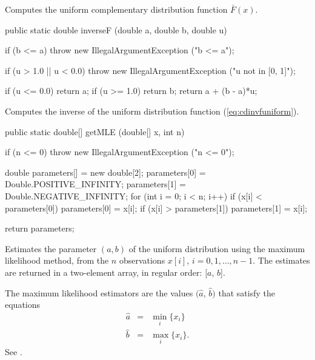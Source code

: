  \begin{tabb}
  Computes the uniform complementary distribution function
  $\bar{F}(x)$.
 \end{tabb}
\begin{code}

   public static double inverseF (double a, double b, double u)\begin{hide} {
       if (b <= a)
           throw new IllegalArgumentException ("b <= a");

       if (u > 1.0 || u < 0.0)
           throw new IllegalArgumentException ("u not in [0, 1]");

       if (u <= 0.0)
           return a;
       if (u >= 1.0)
           return b;
       return a + (b - a)*u;
   }\end{hide}
\end{code}
  \begin{tabb}
  Computes the inverse of the uniform distribution function
 (\ref{eq:cdinvfuniform}).
 \end{tabb}
\begin{code}

   public static double[] getMLE (double[] x, int n)\begin{hide} {
      if (n <= 0)
         throw new IllegalArgumentException ("n <= 0");

      double parameters[] = new double[2];
      parameters[0] = Double.POSITIVE_INFINITY;
      parameters[1] = Double.NEGATIVE_INFINITY;
      for (int i = 0; i < n; i++) {
         if (x[i] < parameters[0])
            parameters[0] = x[i];
         if (x[i] > parameters[1])
            parameters[1] = x[i];    
      }

      return parameters;
   }\end{hide}
\end{code}
\begin{tabb}
   Estimates the parameter $(a, b)$ of the uniform distribution
   using the maximum likelihood method, from the $n$ observations 
   $x[i]$, $i = 0, 1, \ldots, n-1$. The estimates are returned in a two-element
    array, in regular order: [$a$, $b$].
   \begin{detailed}
   The maximum likelihood estimators are the values
   $(\hat{a}$, $\hat{b})$ that satisfy the equations
   \begin{eqnarray*}
      \hat{a} & = & \min_i \{x_i\}\\
      \hat{b} & = & \max_i \{x_i\}.
   \end{eqnarray*}
     See  \cite[page 300]{sLAW00a}.
   \end{detailed}
\end{tabb}
